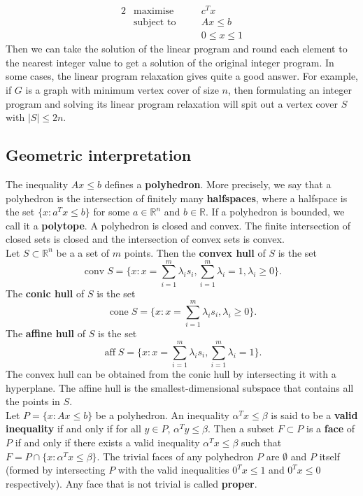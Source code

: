 \documentclass[12pt]{article}
\newcommand{\R}{\mathbb{R}}
\DeclareMathOperator{\conv}{conv}
\DeclareMathOperator{\cone}{cone}
\DeclareMathOperator{\aff}{aff}
\theoremstyle{plain}
\begin{document}
\begin{alignat*}{2}
    & \text{maximise} & \quad & c^Tx \\
    & \text{subject to} & & Ax \leq b\\
    &                   & & 0\leq x\leq 1
\end{alignat*}
Then we can take the solution of the linear program and round each element to the nearest integer value to get a solution of the original integer program. In some cases, the linear program relaxation gives quite a good answer. For example, if $G$ is a graph with minimum vertex cover of size $n$, then formulating an integer program and solving its linear program relaxation will spit out a vertex cover $S$ with $|S|\leq 2n$.

\subsection{Geometric interpretation}
The inequality $Ax\leq b$ defines a \textbf{polyhedron}. More precisely, we say that a polyhedron is the intersection of finitely many \textbf{halfspaces}, where a halfspace is the set $\{x : a^Tx\leq b\}$ for some $a\in \R^n$ and $b\in \R$. If a polyhedron is bounded, we call it a \textbf{polytope}. A polyhedron is closed and convex. The finite intersection of closed sets is closed and the intersection of convex sets is convex.\\
\indent Let $S\subset \R^n$ be a a set of $m$ points. Then the \textbf{convex hull} of $S$ is the set
$$\conv S = \{x : x = \sum_{i=1}^m\lambda_i s_i, \sum_{i=1}^m\lambda_i = 1, \lambda_i \geq 0\}.$$
The \textbf{conic hull} of $S$ is the set
$$\cone S = \{x : x = \sum_{i=1}^m\lambda_i s_i, \lambda_i\geq 0\}.$$
The \textbf{affine hull} of $S$ is the set
$$\aff S = \{x : x = \sum_{i=1}^m\lambda_i s_i, \sum_{i=1}^m\lambda_i = 1\}.$$
The convex hull can be obtained from the conic hull by intersecting it with a hyperplane. The affine hull is the smallest-dimensional subspace that contains all the points in $S$.\\
\indent Let $P = \{x: Ax\leq b\}$ be a polyhedron. An inequality $\alpha^Tx \leq \beta$ is said to be a \textbf{valid inequality} if and only if for all $y\in P$, $\alpha^T y\leq \beta$. Then a subset $F\subset P$ is a \textbf{face} of $P$ if and only if there exists a valid inequality $\alpha^T x\leq \beta$ such that $F = P\cap \{x : \alpha^T x\leq \beta\}$. The trivial faces of any polyhedron $P$ are $\emptyset$ and $P$ itself (formed by intersecting $P$ with the valid inequalities $0^Tx \leq 1$ and $0^Tx\leq 0$ respectively). Any face that is not trivial is called \textbf{proper}.\\
\end{document}
